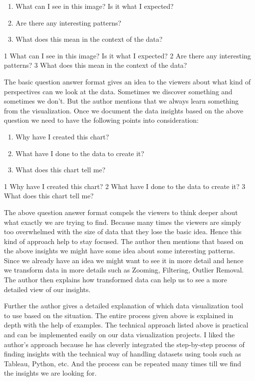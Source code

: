 \documentclass[]{book}
\providecommand{\tightlist}{%
  \setlength{\itemsep}{0pt}\setlength{\parskip}{0pt}}
\theoremstyle{definition}
\theoremstyle{definition}
\theoremstyle{definition}
\theoremstyle{remark}
\begin{document}
\begin{enumerate}
\def\labelenumi{\arabic{enumi}.}
\tightlist
\item
  What can I see in this image? Is it what I expected?\\
\item
  Are there any interesting patterns?\\
\item
  What does this mean in the context of the data?
\end{enumerate}

1 What can I see in this image? Is it what I expected? 2 Are there any
interesting patterns? 3 What does this mean in the context of the data?

The basic question answer format gives an idea to the viewers about what
kind of perspectives can we look at the data. Sometimes we discover
something and sometimes we don't. But the author mentions that we always
learn something from the visualization. Once we document the data
insights based on the above question we need to have the following
points into consideration:

\begin{enumerate}
\def\labelenumi{\arabic{enumi}.}
\tightlist
\item
  Why have I created this chart?\\
\item
  What have I done to the data to create it?\\
\item
  What does this chart tell me?
\end{enumerate}

1 Why have I created this chart? 2 What have I done to the data to
create it? 3 What does this chart tell me?

The above question answer format compels the viewers to think deeper
about what exactly we are trying to find. Because many times the viewers
are simply too overwhelmed with the size of data that they lose the
basic idea. Hence this kind of approach help to stay focused. The author
then mentions that based on the above insights we might have some idea
about some interesting patterns. Since we already have an idea we might
want to see it in more detail and hence we transform data in more
details such as Zooming, Filtering, Outlier Removal. The author then
explains how transformed data can help us to see a more detailed view of
our insights.

Further the author gives a detailed explanation of which data
visualization tool to use based on the situation. The entire process
given above is explained in depth with the help of examples. The
technical approach listed above is practical and can be implemented
easily on our data visualization projects. I liked the author's approach
because he has cleverly integrated the step-by-step process of finding
insights with the technical way of handling datasets using tools such as
Tableau, Python, etc. And the process can be repeated many times till we
find the insights we are looking for.
\end{document}
